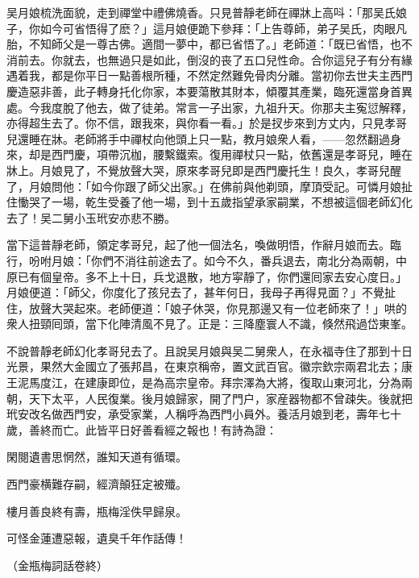 吴月娘梳洗面貌，走到禪堂中禮佛燒香。只見普靜老師在禪牀上高呌：「那吴氏娘子，你如今可省悟得了麽？」這月娘便跪下參拜：「上告尊師，弟子吴氏，肉眼凡胎，不知師父是一尊古佛。適間一夢中，都已省悟了。」老師道：「既已省悟，也不消前去。你就去，也無過只是如此，倒沒的丧了五口兒性命。合你這兒子有分有緣遇着我，都是你平日一點善根所種，不然定然難免骨肉分離。當初你去世夫主西門慶造惡非善，此子轉身托化你家，本要蕩散其財本，傾覆其產業，臨死還當身首異處。今我度脫了他去，做了徒弟。常言一子出家，九祖升天。你那夫主寃愆解釋，亦得超生去了。你不信，跟我來，與你看一看。」於是扠步來到方丈内，只見孝哥兒還睡在牀。老師將手中禪杖向他頭上只一點，教月娘衆人看，——忽然翻過身來，却是西門慶，項帶沉枷，腰繫鐵索。復用禪杖只一點，依舊還是孝哥兒，睡在牀上。月娘見了，不覺放聲大哭，原來孝哥兒即是西門慶托生！良久，孝哥兒醒了，月娘問他：「如今你跟了師父出家。」在佛前與他剃頭，摩頂受記。可憐月娘扯住慟哭了一場，乾生受養了他一場，到十五歲指望承家嗣業，不想被這個老師幻化去了！吴二舅小玉玳安亦悲不勝。

當下這普靜老師，領定孝哥兒，起了他一個法名，喚做明悟，作辭月娘而去。臨行，吩咐月娘：「你們不消往前途去了。如今不久，番兵退去，南北分為兩朝，中原已有個皇帝。多不上十日，兵戈退散，地方寜靜了，你們還囘家去安心度日。」月娘便道：「師父，你度化了孩兒去了，甚年何日，我母子再得見面？」不覺扯住，放聲大哭起來。老師便道：「娘子休哭，你見那邊又有一位老師來了！」哄的衆人扭頸囘頭，當下化陣清風不見了。正是：三降塵寰人不識，倏然飛過岱東峯。

不說普靜老師幻化孝哥兒去了。且說吴月娘與吴二舅衆人，在永福寺住了那到十日光景，果然大金國立了張邦昌，在東京稱帝，置文武百官。徽宗欽宗兩君北去；康王泥馬度江，在建康即位，是為高宗皇帝。拜宗澤為大將，復取山東河北，分為兩朝，天下太平，人民復業。後月娘歸家，開了門户，家産器物都不曾疎失。後就把玳安改名做西門安，承受家業，人稱呼為西門小員外。養活月娘到老，壽年七十歲，善終而亡。此皆平日好善看經之報也！有詩為證：

\begin{myquote}
閑閱遺書思惘然，誰知天道有循環。

西門豪横難存嗣，經濟顛狂定被殲。

樓月善良終有壽，瓶梅淫佚早歸泉。

可怪金蓮遭惡報，遺臭千年作話傳！
\end{myquote}

\begin{myquote}
{\kaishu\small\color{gray}（金瓶梅詞話卷終）}
\end{myquote}


